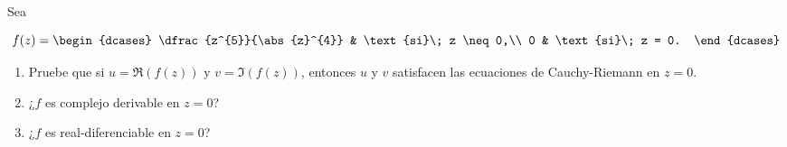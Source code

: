 \documentclass[../main.tex]{subfiles}
\begin{document}
\begin{problema}
    Sea

    \begin{equation*}
        f(z) =
        \begin{dcases}
            \dfrac{z^{5}}{\abs{z}^{4}} & \text{si}\; z \neq 0,\\
            0 & \text{si}\; z = 0.
        \end{dcases}
    \end{equation*}

    \begin{enumerate}
        \item Pruebe que si \(u = \Re(f(z))\) y \(v = \Im(f(z))\), entonces
            \(u\) y \(v\)
            satisfacen las ecuaciones de Cauchy-Riemann en \(z = 0\).
        \item ¿\(f\) es complejo derivable en \(z = 0\)?
        \item ¿\(f\) es real-diferenciable en \(z = 0\)?
    \end{enumerate}
\end{problema}
\end{document}
